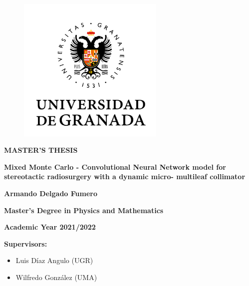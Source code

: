 \documentclass[openany]{article}
\begin{document}

\thispagestyle{empty}    

\begin{titlepage}
\begin{figure}[th]
\begin{flushleft}
    \includegraphics[width=7cm]{ugr.png}
\end{flushleft}
\end{figure}
 \vspace{1cm}

{\flushleft \LARGE \bfseries MASTER'S THESIS\par}\vspace{2cm}

{\flushright \LARGE \bfseries Mixed Monte Carlo - Convolutional Neural Network model for stereotactic radiosurgery with a dynamic micro-
multileaf collimator  \par}\vspace{2cm}

{\flushleft \LARGE \bfseries Armando Delgado Fumero \par}\vspace{1.5cm}

{\flushleft \bfseries Master’s Degree in Physics and Mathematics \par}\vspace{0.cm}

{\flushleft \small \bfseries Academic Year 2021/2022\par}
{\flushleft \small \bfseries Supervisors:
\begin{itemize}
    \item Luis Díaz Angulo (UGR)
    \item Wilfredo González (UMA)
\end{itemize}}\vspace{2cm}



\end{titlepage}
\end{document}
